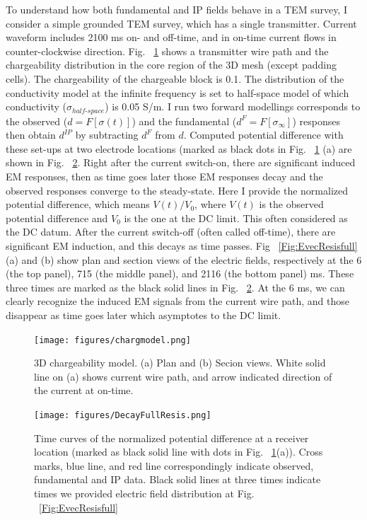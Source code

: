\documentclass[letterpaper,11pt]{article}
\newcommand{\siginf}{\sigma_\infty}
\newcommand{\dip}{d^{IP}}
\begin{document}
To understand how both fundamental and IP fields behave in a TEM survey, I consider a simple grounded TEM survey, which has a single transmitter. Current waveform includes 2100 ms on- and off-time, and in on-time current flows in counter-clockwise direction. Fig. ~\ref{Fig:chargmodel} shows a transmitter wire path and the chargeability distribution in the core region of the 3D mesh (except padding cells). The chargeability of the chargeable block is 0.1. The distribution of the conductivity model at the infinite frequency is set to half-space model of which conductivity ($\sigma_{half\text{-}space}$) is 0.05 S/m. I run two forward modellings corresponds to the observed ($d=F[\sigma(t)]$) and the fundamental ($d^F=F[\siginf]$) responses then obtain $\dip$ by subtracting $d^F$ from $d$. Computed potential difference with these set-ups at two electrode locations (marked as black dots in Fig. ~\ref{Fig:chargmodel} (a) are shown in Fig. ~\ref{Fig:DecayFullResis}. Right after the current switch-on, there are significant induced EM responses, then as time goes later those EM responses decay and the observed responses converge to the steady-state. Here I provide the normalized potential difference, which means $V(t)/V_0$, where $V(t)$ is the observed potential difference and $V_0$ is the one at the DC limit. This often considered as the DC datum. After the current switch-off (often called off-time), there are significant EM induction, and this decays as time passes. Fig ~\ref{Fig:EvecResisfull}(a) and (b) show plan and section views of the electric fields, respectively at the 6 (the top panel), 715 (the middle panel), and 2116 (the bottom panel) ms. These three times are marked as the black solid lines in Fig. ~\ref{Fig:DecayFullResis}. At the 6 ms, we can clearly recognize the induced EM signals from the current wire path, and those disappear as time goes later which asymptotes to the DC limit. 

\begin{figure}[htb]
  \centering
  \texttt{[image: figures/chargmodel.png]}
  \caption{3D chargeability model. (a) Plan and (b) Secion views. White solid line on (a) shows current wire path, and arrow indicated direction of the current at on-time. }
  \label{Fig:chargmodel}
\end{figure}

\begin{figure}[htb]
  \centering
  \texttt{[image: figures/DecayFullResis.png]}
  \caption{Time curves of the normalized potential difference at a receiver location (marked as black solid line with dots in Fig. ~\ref{Fig:chargmodel}(a)). Cross marks, blue line, and red line correspondingly indicate observed, fundamental and IP data. Black solid lines at three times indicate times we provided electric field distribution at Fig. ~\ref{Fig:EvecResisfull}}
  \label{Fig:DecayFullResis}
\end{figure}
\end{document}
